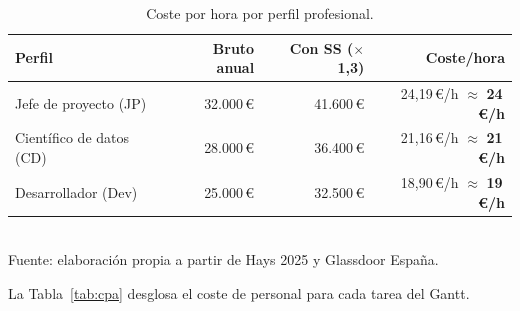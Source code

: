 \documentclass[11pt, a4paper]{article}
\begin{document}
\begin{table}[H]
\centering
\caption{Coste por hora por perfil profesional.}
\label{tab:perfiles}
\small
\begin{tabular}{@{}l r r r@{}}
\toprule
\textbf{Perfil} & \textbf{Bruto anual} & \textbf{Con SS ($\times$1,3)} & \textbf{Coste/hora} \\
\midrule
Jefe de proyecto (JP)   & 32.000\,\euro{} & 41.600\,\euro{} & 24,19\,\euro{}/h $\approx$ \textbf{24\,\euro{}/h} \\
Científico de datos (CD) & 28.000\,\euro{} & 36.400\,\euro{} & 21,16\,\euro{}/h $\approx$ \textbf{21\,\euro{}/h} \\
Desarrollador (Dev)      & 25.000\,\euro{} & 32.500\,\euro{} & 18,90\,\euro{}/h $\approx$ \textbf{19\,\euro{}/h} \\
\bottomrule
\end{tabular}
\\[0.15cm]{\small Fuente: elaboración propia a partir de Hays 2025 y Glassdoor España.}
\end{table}

La Tabla~\ref{tab:cpa} desglosa el coste de personal para cada tarea del Gantt.
\end{document}
